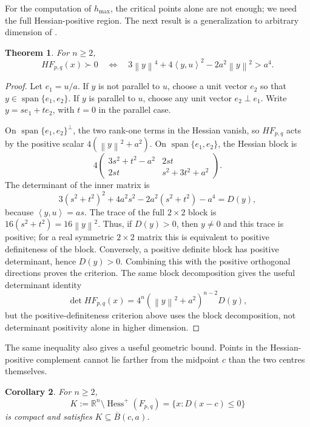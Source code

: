 \documentclass[11pt]{amsart}
\newtheorem{theorem}{Theorem}[section]
\newtheorem{corollary}[theorem]{Corollary}
\theoremstyle{remark}
\newcommand{\Hessp}{\operatorname{Hess}^{+}}
\newcommand{\R}{\mathbb{R}}
\newcommand{\ip}[2]{\left\langle #1,#2\right\rangle}
\newcommand{\norm}[1]{\left\lVert #1\right\rVert}
\begin{document}
For the computation of \(h_{\max}\), the critical points alone are not
enough; we need the full Hessian-positive region. The next result is a generalization to arbitrary dimension of \cite[Remark 3.2]{BrojbeanuPintea-JCA}. 

\begin{theorem}\label{thm:two-centre-hess-region}
For $n\ge2$,
\[
 HF_{p,q}(x)\succ0
 \quad\Longleftrightarrow\quad
 3\norm{y}^4+4\ip{y}{u}^2-2a^2\norm{y}^2>a^4.
\]
\end{theorem}

\begin{proof}
Let $e_1=u/a$. If $y$ is not parallel to $u$, choose a unit vector $e_2$
so that $y\in\operatorname{span}\{e_1,e_2\}$. If $y$ is parallel to $u$,
choose any unit vector $e_2\perp e_1$. Write $y=se_1+te_2$, with $t=0$
in the parallel case.

On $\operatorname{span}\{e_1,e_2\}^{\perp}$, the two rank-one terms in the
Hessian vanish, so $HF_{p,q}$ acts by the positive scalar
$4(\norm{y}^2+a^2)$. On $\operatorname{span}\{e_1,e_2\}$, the Hessian block is
\[
 4\begin{pmatrix}
 3s^2+t^2-a^2 & 2st\\
 2st & s^2+3t^2+a^2
 \end{pmatrix}.
\]
The determinant of the inner matrix is
\[
 3(s^2+t^2)^2+4a^2s^2-2a^2(s^2+t^2)-a^4
 =D(y),
\]
because $\ip{y}{u}=as$. The trace of the full $2\times2$ block is
$16(s^2+t^2)=16\norm{y}^2$. Thus, if $D(y)>0$, then $y\ne0$ and this trace is
positive; for a real symmetric $2\times2$ matrix this is equivalent to
positive definiteness of the block. Conversely, a positive definite block has
positive determinant, hence $D(y)>0$. Combining this with the positive
orthogonal directions proves the criterion. The same block decomposition gives
the useful determinant identity
\[
 \det HF_{p,q}(x)=4^n(\norm{y}^2+a^2)^{n-2}D(y),
\]
but the positive-definiteness criterion above uses the block decomposition, not
determinant positivity alone in higher dimension.
\end{proof}

The same inequality also gives a useful geometric bound.  Points in the
Hessian-positive complement cannot lie farther from the midpoint \(c\) than
the two centres themselves.

\begin{corollary}\label{cor:two-centre-complement-bound}
For $n\ge2$,
\[
 K:=\R^n\setminus\Hessp(F_{p,q})=\{x:D(x-c)\le0\}
\]
is compact and satisfies $K\subseteq\overline B(c,a)$.
\end{corollary}
\end{document}
